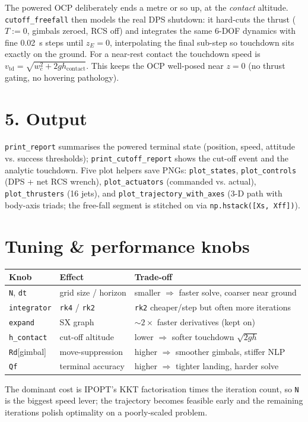 \documentclass[11pt]{article}
\newcommand{\code}[1]{\texttt{#1}}
\begin{document}
The powered OCP deliberately ends a metre or so up, at the \emph{contact}
altitude. \code{cutoff\_freefall} then models the real DPS shutdown: it hard-cuts
the thrust ($T:=0$, gimbals zeroed, RCS off) and integrates the same 6-DOF
dynamics with fine \SI{0.02}{s} steps until $z_E=0$, interpolating the final
sub-step so touchdown sits exactly on the ground. For a near-rest contact the
touchdown speed is $v_{\mathrm{td}}=\sqrt{w_c^2+2gh_{\mathrm{contact}}}$. This
keeps the OCP well-posed near $z=0$ (no thrust gating, no hovering pathology).

\section*{5. Output}

\code{print\_report} summarises the powered terminal state (position, speed,
attitude vs. success thresholds); \code{print\_cutoff\_report} shows the cut-off
event and the analytic touchdown. Five plot helpers save PNGs: \code{plot\_states},
\code{plot\_controls} (DPS + net RCS wrench), \code{plot\_actuators}
(commanded vs. actual), \code{plot\_thrusters} (16 jets), and
\code{plot\_trajectory\_with\_axes} (3-D path with body-axis triads; the free-fall
segment is stitched on via \code{np.hstack([Xs, Xff])}).

\section*{Tuning \& performance knobs}

\begingroup\small
\begin{center}
\begin{tabular}{@{}lll@{}}
\toprule
Knob & Effect & Trade-off\\
\midrule
\code{N}, \code{dt}      & grid size / horizon & smaller $\Rightarrow$ faster solve, coarser near ground\\
\code{integrator}        & \code{rk4} / \code{rk2} & \code{rk2} cheaper/step but often more iterations\\
\code{expand}            & SX graph & $\sim\!2\times$ faster derivatives (kept on)\\
\code{h\_contact}        & cut-off altitude & lower $\Rightarrow$ softer touchdown $\sqrt{2gh}$\\
\code{Rd}[gimbal]        & move-suppression & higher $\Rightarrow$ smoother gimbals, stiffer NLP\\
\code{Qf}                & terminal accuracy & higher $\Rightarrow$ tighter landing, harder solve\\
\bottomrule
\end{tabular}
\end{center}
\endgroup

\noindent The dominant cost is IPOPT's KKT factorisation times the iteration
count, so \code{N} is the biggest speed lever; the trajectory becomes feasible
early and the remaining iterations polish optimality on a poorly-scaled problem.
\end{document}
